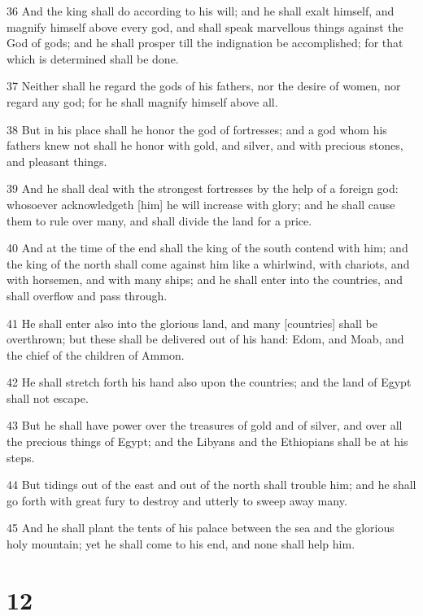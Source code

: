 \par 36 And the king shall do according to his will; and he shall exalt himself, and magnify himself above every god, and shall speak marvellous things against the God of gods; and he shall prosper till the indignation be accomplished; for that which is determined shall be done.
\par 37 Neither shall he regard the gods of his fathers, nor the desire of women, nor regard any god; for he shall magnify himself above all.
\par 38 But in his place shall he honor the god of fortresses; and a god whom his fathers knew not shall he honor with gold, and silver, and with precious stones, and pleasant things.
\par 39 And he shall deal with the strongest fortresses by the help of a foreign god: whosoever acknowledgeth [him] he will increase with glory; and he shall cause them to rule over many, and shall divide the land for a price.
\par 40 And at the time of the end shall the king of the south contend with him; and the king of the north shall come against him like a whirlwind, with chariots, and with horsemen, and with many ships; and he shall enter into the countries, and shall overflow and pass through.
\par 41 He shall enter also into the glorious land, and many [countries] shall be overthrown; but these shall be delivered out of his hand: Edom, and Moab, and the chief of the children of Ammon.
\par 42 He shall stretch forth his hand also upon the countries; and the land of Egypt shall not escape.
\par 43 But he shall have power over the treasures of gold and of silver, and over all the precious things of Egypt; and the Libyans and the Ethiopians shall be at his steps.
\par 44 But tidings out of the east and out of the north shall trouble him; and he shall go forth with great fury to destroy and utterly to sweep away many.
\par 45 And he shall plant the tents of his palace between the sea and the glorious holy mountain; yet he shall come to his end, and none shall help him.

\chapter{12}

